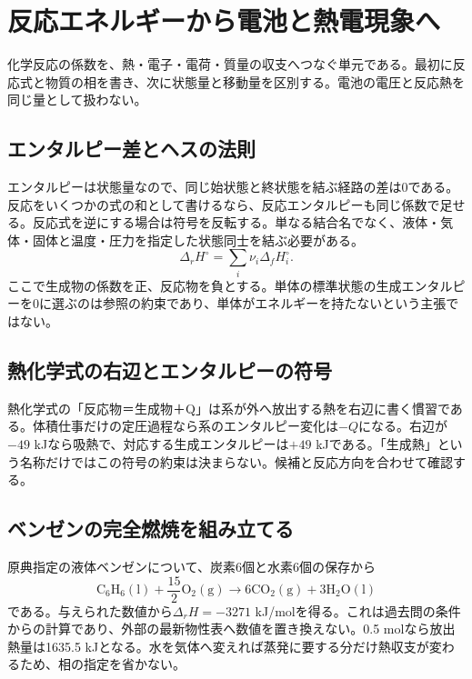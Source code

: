 \section{反応エネルギーから電池と熱電現象へ}
\label{theory:electrochem:overview}
化学反応の係数を、熱・電子・電荷・質量の収支へつなぐ単元である。最初に反応式と物質の相を書き、次に状態量と移動量を区別する。電池の電圧と反応熱を同じ量として扱わない。

\subsection{エンタルピー差とヘスの法則}
\label{theory:electrochem:hess}
エンタルピーは状態量なので、同じ始状態と終状態を結ぶ経路の差は0である。反応をいくつかの式の和として書けるなら、反応エンタルピーも同じ係数で足せる。反応式を逆にする場合は符号を反転する。単なる結合名でなく、液体・気体・固体と温度・圧力を指定した状態同士を結ぶ必要がある\cite{openstax_hess}。
\[
 \Delta_r H^\circ=\sum_i\nu_i\Delta_f H_i^\circ .
\]
ここで生成物の係数を正、反応物を負とする。単体の標準状態の生成エンタルピーを0に選ぶのは参照の約束であり、単体がエネルギーを持たないという主張ではない。

\subsection{熱化学式の右辺とエンタルピーの符号}
\label{theory:electrochem:heat_sign}
熱化学式の「反応物＝生成物＋Q」は系が外へ放出する熱を右辺に書く慣習である。体積仕事だけの定圧過程なら系のエンタルピー変化は$-Q$になる。右辺が$-49$ kJなら吸熱で、対応する生成エンタルピーは$+49$ kJである。「生成熱」という名称だけではこの符号の約束は決まらない。候補と反応方向を合わせて確認する。

\subsection{ベンゼンの完全燃焼を組み立てる}
\label{theory:electrochem:combustion}
原典指定の液体ベンゼンについて、炭素6個と水素6個の保存から
\[
 \mathrm{C_6H_6(l)}+\frac{15}{2}\mathrm{O_2(g)}
 \longrightarrow6\mathrm{CO_2(g)}+3\mathrm{H_2O(l)}
\]
である。与えられた数値から$\Delta_rH=-3271$ kJ/molを得る。これは過去問の条件からの計算であり、外部の最新物性表へ数値を置き換えない。0.5 molなら放出熱量は1635.5 kJとなる。水を気体へ変えれば蒸発に要する分だけ熱収支が変わるため、相の指定を省かない。

